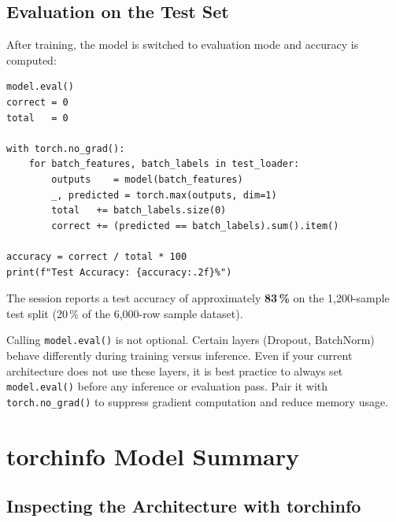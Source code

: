 \documentclass[12pt,a4paper]{article}
\begin{document}
\subsection{Evaluation on the Test Set}
\label{subsec:evaluation}

After training, the model is switched to evaluation mode and accuracy is
computed:

\begin{tcolorbox}[colback=gray!5!white, colframe=gray!60!black,
  fonttitle=\bfseries, title=Listing 6: Test evaluation]
\begin{verbatim}
model.eval()
correct = 0
total   = 0

with torch.no_grad():
    for batch_features, batch_labels in test_loader:
        outputs    = model(batch_features)
        _, predicted = torch.max(outputs, dim=1)
        total   += batch_labels.size(0)
        correct += (predicted == batch_labels).sum().item()

accuracy = correct / total * 100
print(f"Test Accuracy: {accuracy:.2f}%")
\end{verbatim}
\end{tcolorbox}

The session reports a test accuracy of approximately \textbf{83\,\%} on the
1{,}200-sample test split (20\,\% of the 6{,}000-row sample dataset).

\begin{warningbox}[title=model.eval() is essential]
Calling \texttt{model.eval()} is not optional.  Certain layers (Dropout,
BatchNorm) behave differently during training versus inference.  Even if your
current architecture does not use these layers, it is best practice to always
set \texttt{model.eval()} before any inference or evaluation pass.  Pair it
with \texttt{torch.no\_grad()} to suppress gradient computation and reduce
memory usage.
\end{warningbox}

\section{torchinfo Model Summary}
\label{sec:torchinfo}

\subsection{Inspecting the Architecture with torchinfo}
\label{subsec:torchinfo}
\end{document}
